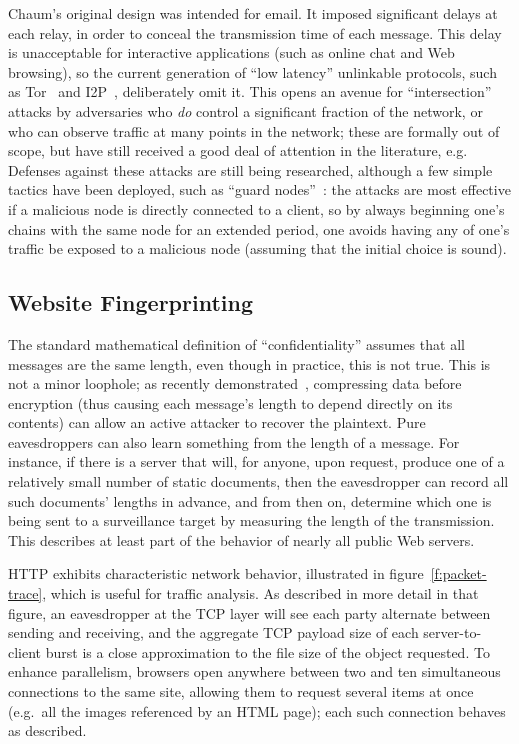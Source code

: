 \documentclass{zarticle}
\begin{document}
Chaum's original design was intended for email. It imposed significant
delays at each relay, in order to conceal the transmission time of
each message.  This delay is unacceptable for interactive applications
(such as online chat and Web browsing), so the current generation of
“low latency” unlinkable protocols, such as
Tor~\cite{dingledine2004tor} and I2P~\cite{i2p.undated.i2p},
deliberately omit it.  This opens an avenue for “intersection” attacks
by adversaries who \emph{do} control a significant fraction of the
network, or who can observe traffic at many points in the network;
these are formally out of scope, but have still received a good deal
of attention in the literature, e.g.~\cite{danezis2003statistical,
  danezis2004continuous, danezis2005statistical, danezis2007twosided,
  murdoch2007sampled, shmatikov2006timing, overlier2006locating}
Defenses against these attacks are still being researched, although a
few simple tactics have been deployed, such as “guard
nodes”~\cite{overlier2006locating}: the attacks are most effective if
a malicious node is directly connected to a client, so by always
beginning one's chains with the same node for an extended period, one
avoids having any of one's traffic be exposed to a malicious node
(assuming that the initial choice is sound).

\subsection{Website Fingerprinting}



The standard mathematical definition of “confidentiality” assumes that
all messages are the same length, even though in practice, this is not
true.  This is not a minor loophole; as recently
demonstrated~\cite{duong2012crime,gluck2013breach}, compressing data
before encryption (thus causing each message's length to depend
directly on its contents) can allow an active attacker to recover the
plaintext.  Pure eavesdroppers can also learn something from the
length of a message.  For instance, if there is a server that will,
for anyone, upon request, produce one of a relatively small number of
static documents, then the eavesdropper can record all such documents'
lengths in advance, and from then on, determine which one is being
sent to a surveillance target by measuring the length of the
transmission.  This describes at least part of the behavior of nearly
all public Web servers.

HTTP exhibits characteristic network behavior, illustrated in
figure~\ref{f:packet-trace}, which is useful for traffic analysis.  As
described in more detail in that figure, an eavesdropper at the TCP
layer will see each party alternate between sending and receiving, and
the aggregate TCP payload size of each server-to-client burst is a
close approximation to the file size of the object requested.  To
enhance parallelism, browsers open anywhere between two and ten
simultaneous connections to the same site, allowing them to request
several items at once (e.g.\ all the images referenced by an HTML
page); each such connection behaves as described.
\end{document}
